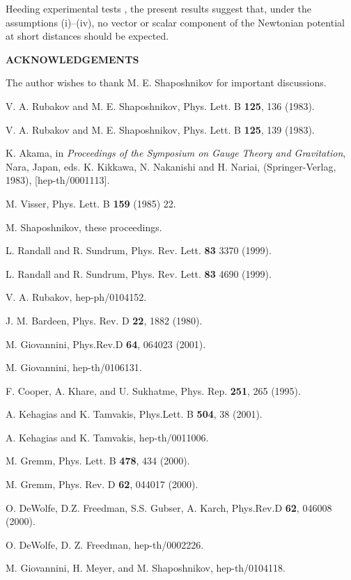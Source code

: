 \documentclass[a4paper,12pt]{article}
\providecommand{\Acknowledgements}{\bigskip  \bigskip \begin{center} \begin{large}
             \bf ACKNOWLEDGEMENTS \end{large}\end{center}}
\begin{document}
Heeding experimental tests \cite{exp}, 
the present results suggest that, under the 
assumptions (i)--(iv), no vector or scalar component of the Newtonian 
potential at short distances should be expected.

\Acknowledgements
The author wishes to thank M. E. Shaposhnikov 
for important discussions.

\begin{thebibliography}{99}
 V. A. Rubakov and M. E. Shaposhnikov, Phys. Lett. 
B {\bf 125}, 136
(1983).

 V. A. Rubakov and M. E. Shaposhnikov, Phys. Lett. B {\bf 125}, 139
(1983).

 K. Akama, in {\em Proceedings of the 
Symposium on Gauge Theory and Gravitation}, Nara, Japan, 
eds. K. Kikkawa, N. Nakanishi and H. Nariai, (Springer-Verlag, 1983),
[hep-th/0001113].

 M. Visser, Phys. Lett. B {\bf 159} (1985) 22.

 M. Shaposhnikov, these proceedings. 

 L. Randall and R. Sundrum, Phys. 
Rev. Lett. {\bf 83} 3370 (1999). 

  L. Randall and R. Sundrum, Phys. 
Rev. Lett. {\bf 83} 4690 (1999). 

 V. A. Rubakov,  hep-ph/0104152.

 J. M. Bardeen, Phys. Rev. D {\bf 22}, 1882 (1980).

 M. Giovannini, Phys.Rev.D {\bf 64}, 064023 (2001). 

 M. Giovannini, hep-th/0106131. 

 F. Cooper, A. Khare, and U. Sukhatme, Phys. Rep. 
{\bf 251}, 265 (1995).

 A. Kehagias and K. Tamvakis, Phys.Lett. B {\bf 504}, 38 (2001).

 A. Kehagias and K. Tamvakis, hep-th/0011006.

 M. Gremm, Phys. Lett. B {\bf 478}, 434 (2000).

 M. Gremm,  Phys. Rev. D {\bf 62}, 044017 (2000).

 O. DeWolfe, D.Z. Freedman, S.S. Gubser, A. Karch, 
Phys.Rev.D {\bf 62}, 046008 (2000).  

 O. DeWolfe, D. Z. Freedman, hep-th/0002226. 

 M. Giovannini, H. Meyer, and M. Shaposhnikov, hep-th/0104118. 


\end{thebibliography}
\end{document}
